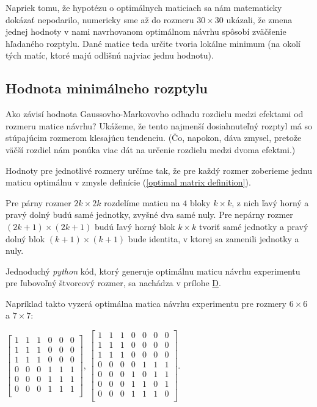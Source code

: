 Napriek tomu, že hypotézu o optimálnych maticiach sa nám matematicky dokázať nepodarilo, numericky sme až do rozmeru $30 \times 30$ ukázali,
že zmena jednej hodnoty v nami navrhovanom optimálnom návrhu spôsobí zväčšenie hľadaného rozptylu.
Dané matice teda určite tvoria lokálne minimum (na okolí tých matíc, ktoré majú odlišnú najviac jednu hodnotu).

\subsection{Hodnota minimálneho rozptylu}

Ako závisí hodnota Gaussovho-Markovovho odhadu rozdielu medzi efektami od rozmeru matice návrhu? 
Ukážeme, že tento najmenší dosiahnuteľný rozptyl má so stúpajúcim rozmerom klesajúcu tendenciu. 
(Čo, napokon, dáva zmysel, pretože väčší rozdiel nám ponúka viac dát na určenie rozdielu medzi dvoma efektmi.)

Hodnoty pre jednotlivé rozmery určíme tak, že pre každý rozmer zoberieme jednu maticu optimálnu 
v zmysle definície (\ref{optimal matrix definition}).

Pre párny rozmer $2k \times 2k$ rozdelíme maticu na $4$ bloky $k \times k$, 
z nich ľavý horný a pravý dolný budú samé jednotky, zvyšné dva samé nuly. 
Pre nepárny rozmer $(2k + 1) \times (2k + 1)$ budú ľavý horný blok $k \times k$ tvoriť samé jednotky 
a pravý dolný blok $(k + 1) \times (k + 1)$ bude identita, v ktorej sa zamenili jednotky a nuly.

Jednoduchý \emph{python} kód, ktorý generuje optimálnu maticu návrhu experimentu pre ľubovoľný štvorcový rozmer,
sa nachádza v prílohe \hyperref[appendix:d]{D}.

Napríklad takto vyzerá optimálna matica návrhu experimentu pre rozmery $6 \times 6$ a $7 \times 7$:

\begin{center}
$
\begin{bmatrix}
1 & 1 & 1 & 0 & 0 & 0 \\
1 & 1 & 1 & 0 & 0 & 0 \\
1 & 1 & 1 & 0 & 0 & 0 \\
0 & 0 & 0 & 1 & 1 & 1 \\
0 & 0 & 0 & 1 & 1 & 1 \\
0 & 0 & 0 & 1 & 1 & 1 \\
\end{bmatrix}
$,
$
\begin{bmatrix}
1 & 1 & 1 & 0 & 0 & 0 & 0 \\
1 & 1 & 1 & 0 & 0 & 0 & 0 \\
1 & 1 & 1 & 0 & 0 & 0 & 0 \\
0 & 0 & 0 & 0 & 1 & 1 & 1 \\
0 & 0 & 0 & 1 & 0 & 1 & 1 \\
0 & 0 & 0 & 1 & 1 & 0 & 1 \\
0 & 0 & 0 & 1 & 1 & 1 & 0 \\
\end{bmatrix}
$.
\end{center}


